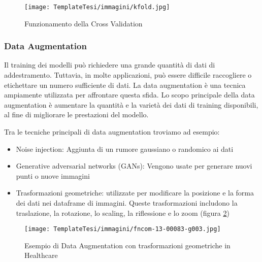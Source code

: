 \begin{flushleft}
\begin{figure}[H]
    \centering
    \texttt{[image: TemplateTesi/immagini/kfold.jpg]}
    \caption{Funzionamento della Cross Validation \cite{ImmKFOld}}
    \label{fig:crossvalidation}
\end{figure}
\subsubsection{Data Augmentation}
 Il training dei modelli può richiedere una grande quantità di dati di addestramento. 
 Tuttavia, in molte applicazioni, può essere difficile raccogliere o etichettare un numero sufficiente di dati. 
 La data augmentation è una tecnica ampiamente utilizzata per affrontare questa sfida.
 Lo scopo principale della data augmentation è aumentare la quantità e la varietà dei dati di training disponibili, al fine di migliorare le prestazioni del modello.

 Tra le tecniche principali di data augmentation troviamo ad esempio:
 \begin{itemize}
     \item Noise injection: Aggiunta di un rumore gaussiano o randomico ai dati 
     \item Generative adversarial networks (GANs): Vengono usate per generare nuovi punti o nuove immagini 
     \item Trasformazioni geometriche: utilizzate per modificare la posizione e la forma dei dati nei dataframe di immagini. Queste trasformazioni includono la traslazione, la rotazione, lo scaling, la riflessione e lo zoom (figura \ref{fig:trasformazioni})
 \end{itemize}
 

\begin{figure}[H]
    \centering
    \texttt{[image: TemplateTesi/immagini/fncom-13-00083-g003.jpg]}
    \caption{Esempio di Data Augmentation con trasformazioni geometriche in Healthcare \cite{imm_dataaug}}
    \label{fig:trasformazioni}
\end{figure}


\end{flushleft}
